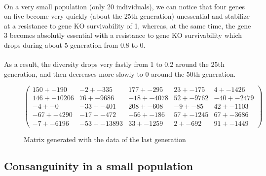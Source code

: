 \documentclass[]{report} %
\begin{document}
    \paragraph*{}
    On a very small population (only 20 individuals), we can notice that four genes on five become very quickly (about the 25th generation) unessential and stabilize 
    at a resistance to gene KO survivability of 1, whereas, at the same time, the gene 3 becomes absolutly essential 
    with a resistance to gene KO survivability which drops during about 5 generation from 0.8 to 0. 
    \paragraph*{}
    As a result, the diversity drops very fastly from 1 to 0.2 around the 25th generation, and then decreases more slowly to 0 around the 50th generation.
   

    \begin{figure}[H] 
            \centering
            \small
    $
          \begin{pmatrix}
                150 +- 190 & -2 +- 335 & 177 +- 295 & 23 +- 175 & 4 +- 1426 \\
                146 +- 10206 & 76 +- 9686 & -18 +- 4078 & 52 +- 9762 & -40 +- 2479 \\
                -4 +- 0 & -33 +- 401 & 208 +- 608 & -9 +- 85 & 42 +- 1103 \\
                -67 +- 4290 & -17 +- 472 & -56 +- 186 & 57 +- 1245 & 67 +- 3686 \\
                -7 +- 6196 & -53 +- 13893 & 33 +- 1259 & 2 +- 692 & 91 +- 1449 
           \end{pmatrix}
    $
            \caption{\footnotesize Matrix generated with the data of the last generation}
            \label{mat:ps20xg200xmr1-10-4}
    \end{figure}
    
    
    
\subsection{Consanguinity in a small population}
\end{document}
